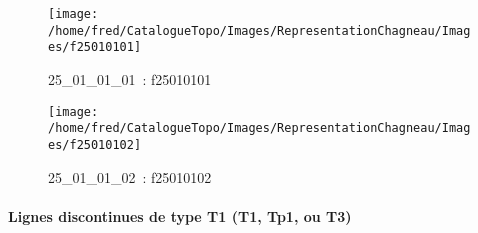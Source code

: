 \documentclass[12pt,titlepage]{book}
\begin{document}
\begin{figure}[h!]
  \hfill         %
  \begin{minipage}[t]{3cm}
    \begin{center}
      \texttt{[image: /home/fred/CatalogueTopo/Images/RepresentationChagneau/Images/f25010101]}
      \caption[~25\_01\_01\_01]{\small{25\_01\_01\_01~:} \tiny{f25010101}}\label{f25010101}
    \end{center}
  \end{minipage}
  \begin{minipage}[t]{3cm}
    \begin{center}
      \texttt{[image: /home/fred/CatalogueTopo/Images/RepresentationChagneau/Images/f25010102]}
      \caption[~25\_01\_01\_02]{\small{25\_01\_01\_02~:} \tiny{f25010102}}\label{f25010102}
    \end{center}
  \end{minipage}
\end{figure}


\paragraph{Lignes discontinues de type T1 (T1, Tp1, ou T3)}
\noindent
\vspace{\baselineskip}
\end{document}
